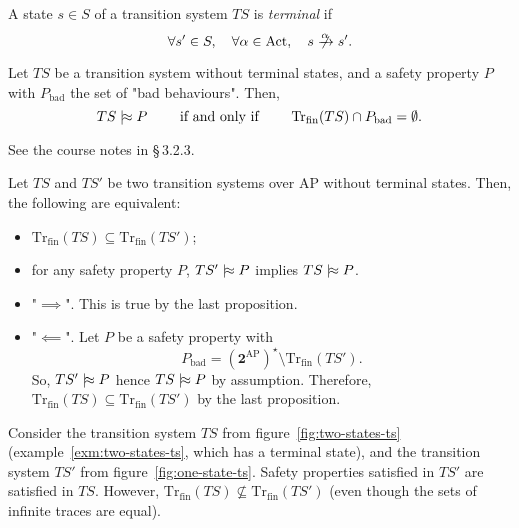 \documentclass[./main]{subfiles}
\begin{document}
  \begin{defn}
    A state $s \in S$ of a transition system $TS$  is \textit{terminal} if
    \[
      \forall s' \in S, \quad \forall \alpha \in \mathrm{Act}, \quad s \centernot{\tr\alpha} s'
    .\]
  \end{defn}

  \begin{prop}
    Let $TS$ be a transition system without terminal states, and a safety property $P$ with $P_\mathrm{bad}$ the set of "bad behaviours".
    Then, 
    \[
    TS \mathrel{{|}\!{\approx}} P \quad\quad \text{ if and only if } \quad\quad \mathrm{Tr}_\mathrm{fin}(TS) \cap P_\mathrm{bad} = \emptyset
    .\] 
  \end{prop}
  \begin{prv}
    See the course notes in §\,3.2.3.
  \end{prv}

  \begin{lem}
    Let $TS$ and $TS'$ be two transition systems over $\mathrm{AP}$ without terminal states.
    Then, the following are equivalent:
    \begin{itemize}
      \item $\mathrm{Tr}_\mathrm{fin}(TS) \subseteq \mathrm{Tr}_\mathrm{fin}(TS')$;
      \item for any safety property $P$, $TS' \mathrel{{|}\!{\approx}} P$ implies $TS \mathrel{{|}\!{\approx}} P$.
    \end{itemize}
  \end{lem}
  \begin{prv}
    \begin{itemize}
      \item "$\implies$". This is true by the last proposition.
      \item "$\impliedby$". 
        Let $P$ be a safety property with \[
        P_\mathrm{bad} = (\mathbf{2}^\mathrm{AP})^\star \setminus \mathrm{Tr}_\mathrm{fin}(TS')
        .\]
        So, $TS' \mathrel{{|}\!{\approx}} P$ hence  $TS \mathrel{{|}\!{\approx}} P$ by assumption.
        Therefore,  $\mathrm{Tr}_\mathrm{fin}(TS) \subseteq \mathrm{Tr}_\mathrm{fin}(TS')$ by the last proposition.
    \end{itemize}
  \end{prv}

  \begin{exm}
    Consider the transition system $TS$ from figure~\ref{fig:two-states-ts} (example~\ref{exm:two-states-ts}, which has a terminal state), and the transition system $TS'$ from figure~\ref{fig:one-state-ts}.
    Safety properties satisfied in $TS'$ are satisfied in $TS$. However, $\mathrm{Tr}_\mathrm{fin}(TS) \not\subseteq \mathrm{Tr}_\mathrm{fin}(TS')$ (even though the sets of infinite traces are equal).
  \end{exm}
\end{document}

